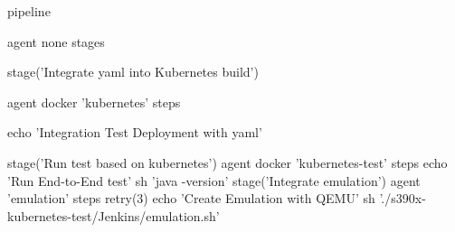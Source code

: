 \begin{boxedverbatim}
pipeline {
    agent none 
    stages {
        stage('Integrate yaml into Kubernetes build') {
            agent { docker 'kubernetes' } 
            steps {
                echo 'Integration Test Deployment with yaml'
               
            }
        }
        stage('Run test based on kubernetes') {
            agent { docker 'kubernetes-test' } 
            steps {
                echo 'Run End-to-End test'
                sh 'java -version'
            }
        }
        stage('Integrate emulation') {
            agent { 'emulation' } 
            steps {
              retry(3){
                    echo 'Create Emulation with QEMU'
                    sh './s390x-kubernetes-test/Jenkins/emulation.sh'        
              }     
            }
        }
    }
}
\end{boxedverbatim}